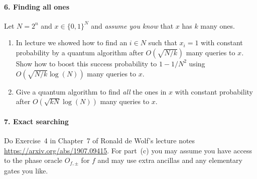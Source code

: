 \paragraph*{6. Finding all ones}
Let $N = 2^n$ and $x \in \{0,1\}^N$ and \emph{assume you know} that $x$ has $k$ many ones.  
\begin{enumerate}
\item In lecture we showed how to find an $i \in N$ such that $x_i =1$ with constant probability by a quantum algorithm after $O(\sqrt{N/k})$ many queries to $x$.  
Show how to boost this success probability to $1-1/N^2$ using $O(\sqrt{N/k} \log(N))$ many queries to $x$.
\item Give a quantum algorithm  to find \emph{all} the ones in $x$ with constant probability after $O(\sqrt{kN} \log(N))$ many queries to $x$.
\end{enumerate}

\paragraph*{7. Exact searching}
Do Exercise~4 in Chapter~7 of Ronald de Wolf's lecture notes \url{https://arxiv.org/abs/1907.09415}.  For part~(c) you may assume 
you have access to the phase oracle $O_{f,\pm}$ for $f$ and may use extra ancillas and any elementary gates you like.

















